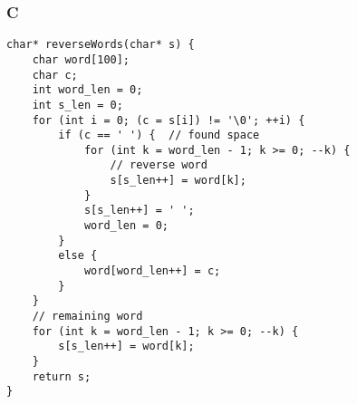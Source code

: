 \subsubsection*{C}
\begin{verbatim}
char* reverseWords(char* s) {
    char word[100];
    char c;
    int word_len = 0;
    int s_len = 0;
    for (int i = 0; (c = s[i]) != '\0'; ++i) {
        if (c == ' ') {  // found space
            for (int k = word_len - 1; k >= 0; --k) {
                // reverse word
                s[s_len++] = word[k];
            }
            s[s_len++] = ' ';
            word_len = 0;
        }
        else {
            word[word_len++] = c;
        }
    }
    // remaining word
    for (int k = word_len - 1; k >= 0; --k) {
        s[s_len++] = word[k];
    }
    return s;
}
\end{verbatim}

\newpage
